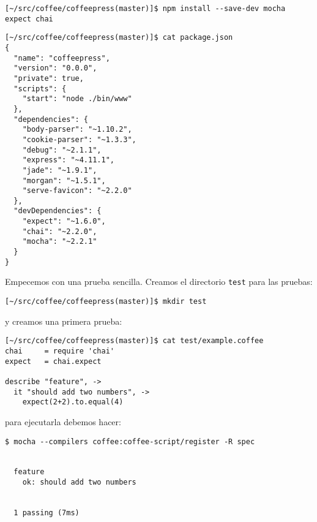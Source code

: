 \begin{verbatim}
[~/src/coffee/coffeepress(master)]$ npm install --save-dev mocha expect chai
\end{verbatim}

\begin{verbatim}
[~/src/coffee/coffeepress(master)]$ cat package.json 
{
  "name": "coffeepress",
  "version": "0.0.0",
  "private": true,
  "scripts": {
    "start": "node ./bin/www"
  },
  "dependencies": {
    "body-parser": "~1.10.2",
    "cookie-parser": "~1.3.3",
    "debug": "~2.1.1",
    "express": "~4.11.1",
    "jade": "~1.9.1",
    "morgan": "~1.5.1",
    "serve-favicon": "~2.2.0"
  },
  "devDependencies": {
    "expect": "~1.6.0",
    "chai": "~2.2.0",
    "mocha": "~2.2.1"
  }
}
\end{verbatim}

Empecemos con una prueba sencilla.
Creamos el directorio \verb|test| para las pruebas:

\begin{verbatim}
[~/src/coffee/coffeepress(master)]$ mkdir test
\end{verbatim}
y creamos una primera prueba:
\begin{verbatim}
[~/src/coffee/coffeepress(master)]$ cat test/example.coffee
chai     = require 'chai'
expect   = chai.expect

describe "feature", ->
  it "should add two numbers", ->
    expect(2+2).to.equal(4)
\end{verbatim}
para ejecutarla debemos hacer:
\begin{verbatim}
$ mocha --compilers coffee:coffee-script/register -R spec


  feature
    ok: should add two numbers 


  1 passing (7ms)
\end{verbatim}

